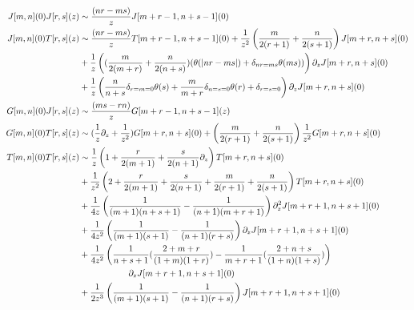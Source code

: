 \documentclass[11pt]{amsart}
\theoremstyle{thm}
\numberwithin{equation}{subsection}
\theoremstyle{def}
\theoremstyle{rem}
\begin{document}
\begin{align}
J[m,n](0)J[r, s](z) &\sim {(nr-ms) \over z}J[m + r -1, n + s -1](0) \\
J[m, n](0)T[r, s](z) &\sim {(nr-ms) \over z}T[m + r -1, n + s -1](0) + {1 \over z^2}\left({m \over 2(r + 1)} + {n \over 2(s + 1)}\right)J[m + r, n + s](0) \\ \nonumber
&+{1 \over z}\left(({m \over 2 (m + r)} + {n \over 2 (n + s)})(\theta(|nr-ms|) + \delta_{nr = ms}\theta(ms)) \right)\partial_z J[m + r, n+s](0) \\ \nonumber
&+{1 \over z}\left({n \over n + s}\delta_{r =m=0}\theta(s) + {m \over m + r}\delta_{n = s=0}\theta(r) + \delta_{r = s= 0} \right)\partial_zJ[m + r, n+s](0)\\
G[m, n](0)J[r, s](z) &\sim {(ms - rn) \over z}G[m + r -1, n + s - 1](z) \\
G[m, n](0)T[r, s](z) &\sim ({1 \over z} \partial_z + {1 \over z^2})G[m + r, n+s](0) + \left({m \over 2(r+1)} + {n \over 2 (s + 1)}\right){1 \over z^2}G[m + r, n+s](0) \\
T[m, n](0)T[r, s](z) &\sim {1 \over z}\left(1 + {r \over 2(m+1)} + {s \over 2(n+1)}\partial_z \right) T[m + r, n +s](0) \\ \nonumber &+ {1 \over z^2}\left(2 + {r \over 2(m+1)} + {s \over 2(n+1)} + {m \over 2(r+1)} + {n \over 2(s+1)} \right)T[m + r, n + s](0)\\ \nonumber
&+{1 \over 4 z}\left({1 \over (m + 1)(n + s + 1)}- {1 \over (n +1)(m + r + 1)} \right) \partial^2_z J[m + r  +1, n + s +1](0) \\ \nonumber
&+{1 \over 4 z^2}\left({1 \over (m + 1)(s + 1)}- {1 \over (n+1)(r + s)}\right)\partial_z J[m + r + 1, n + s + 1](0) \\ \nonumber 
&+ {1 \over 4 z^2}\left({1 \over n + s + 1}({2 + m + r \over (1 + m)(1 + r)}) - {1 \over m + r + 1}({2 + n + s \over (1 + n)(1 + s)}) \right) \\ \nonumber & \ \ \ \ \ \ \ \ \ \ \ \ \ \ \ \ \ \partial_z J[m + r + 1, n + s + 1](0) \\ \nonumber
&+{1 \over 2 z^3}\left( {1 \over (m + 1)(s + 1)}- {1 \over (n+1)(r + s)}\right) J[m + r + 1, n + s + 1](0)
\end{align}
\end{document}
